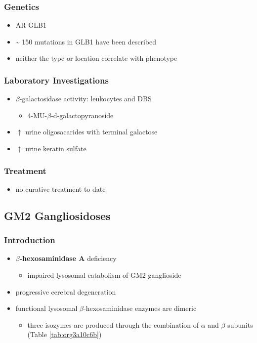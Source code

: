 \documentclass[12pt]{scrartcl}
\begin{document}
\subsubsection{Genetics}
\label{sec:orga1bbab7}
\begin{itemize}
\item AR GLB1
\item \textasciitilde{} 150 mutations in GLB1 have been described
\item neither the type or location correlate with phenotype
\end{itemize}
\subsubsection{Laboratory Investigations}
\label{sec:orgd76f4e9}
\begin{itemize}
\item \(\beta\)-galactosidase activity: leukocytes and DBS
\begin{itemize}
\item 4-MU-\(\beta\)-d-galactopyranoside
\end{itemize}
\item \(\uparrow\) urine oligosacarides with terminal galactose
\item \(\uparrow\) urine keratin sulfate
\end{itemize}

\subsubsection{Treatment}
\label{sec:org68cd7ff}
\begin{itemize}
\item no curative treatment to date
\end{itemize}
\subsection{GM2 Gangliosidoses}
\label{sec:org069b182}
\subsubsection{Introduction}
\label{sec:org8e3169d}
\begin{itemize}
\item \textbf{\(\beta\)-hexosaminidase A} deficiency 
\begin{itemize}
\item impaired lysosomal catabolism of GM2 ganglioside
\end{itemize}
\item progressive cerebral degeneration
\item functional lysosomal \(\beta\)-hexosaminidase enzymes are dimeric
\begin{itemize}
\item three isozymes are produced through the combination of \(\alpha\)
and \(\beta\) subunits (Table \ref{tab:org3a10c6b})
\end{itemize}
\end{itemize}
\end{document}
